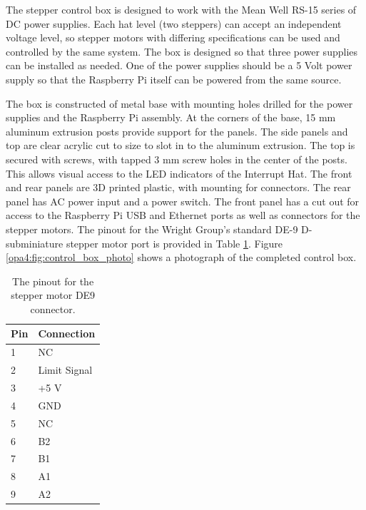 The stepper control box is designed to work with the Mean Well RS-15 series of DC power supplies\cite{meanwell_rs15}.
Each hat level (two steppers) can accept an independent voltage level, so stepper motors with differing specifications can be used and controlled by the same system.
The box is designed so that three power supplies can be installed as needed.
One of the power supplies should be a 5 Volt power supply so that the Raspberry Pi itself can be powered from the same source.

The box is constructed of metal base with mounting holes drilled for the power supplies and the Raspberry Pi assembly.
At the corners of the base, 15 mm aluminum extrusion posts provide support for the panels.
The side panels and top are clear acrylic cut to size to slot in to the aluminum extrusion.
The top is secured with screws, with tapped 3 mm screw holes in the center of the posts.
This allows visual access to the LED indicators of the Interrupt Hat.
The front and rear panels are 3D printed plastic, with mounting for connectors.
The rear panel has AC power input and a power switch.
The front panel has a cut out for access to the Raspberry Pi USB and Ethernet ports as well as connectors for the stepper motors.
The pinout for the Wright Group's standard DE-9 D-subminiature stepper motor port is provided in Table \ref{opa4:tab:de9}.
Figure \ref{opa4:fig:control_box_photo} shows a photograph of the completed control box.

\begin{table}[]
\begin{tabular}{ll}
\hline
Pin & Connection   \\ \hline
1   & NC           \\
2   & Limit Signal \\
3   & +5 V         \\
4   & GND          \\
5   & NC           \\
6   & B2           \\
7   & B1           \\
8   & A1           \\
9   & A2           \\ \hline
\end{tabular}
	\caption[Stepper Motor DE9 Pinout]{The pinout for the stepper motor DE9 connector.}
	\label{opa4:tab:de9}
\end{table}

